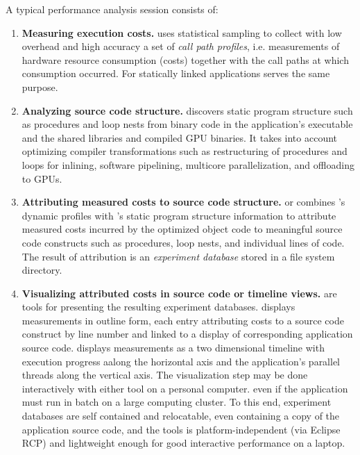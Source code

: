 \documentclass[english]{article}
\begin{document}
A typical performance analysis session consists of:
\begin{enumerate}
\item \textbf{Measuring execution costs.}  
 uses statistical sampling to collect with low overhead and high accuracy
a set of \emph{call path profiles},
i.e. measurements of hardware resource consumption (costs) together with the call paths at which consumption occurred.
For statically linked applications  serves the same purpose.

\item \textbf{Analyzing source code structure.} 
 discovers static program structure such as procedures and loop nests
from binary code in the application's executable and the shared libraries and compiled GPU binaries.
It takes into account optimizing compiler transformations such as restructuring of procedures and loops
for inlining, software pipelining, multicore parallelization, and offloading to GPUs.

\item \textbf{Attributing measured costs to source code structure.} 
 or 
combines 's dynamic profiles
with 's static program structure information
to attribute measured costs incurred by the optimized object code
to meaningful source code constructs such as procedures, loop nests, and individual lines of code.
The result of attribution is an \emph{experiment database} stored in a file system directory.

\item \textbf{Visualizing attributed costs in source code or timeline views.}
are tools for presenting the resulting experiment databases.
 displays measurements in outline form,
each entry attributing costs to a source code construct by line number
and linked to a display of corresponding application source code.
 displays measurements as a two dimensional timeline
with execution progress aalong the horizontal axis
and the application's parallel threads along the vertical axis.
The visualization step may be done  interactively with either tool on a personal computer.
even if the application must run in batch on a large computing cluster.
To this end, experiment databases are self contained and relocatable,
even containing a copy of the application source code,
and the  tools
is platform-independent (via Eclipse RCP)
and lightweight enough for good interactive performance on a laptop.

\end{enumerate}
\end{document}
